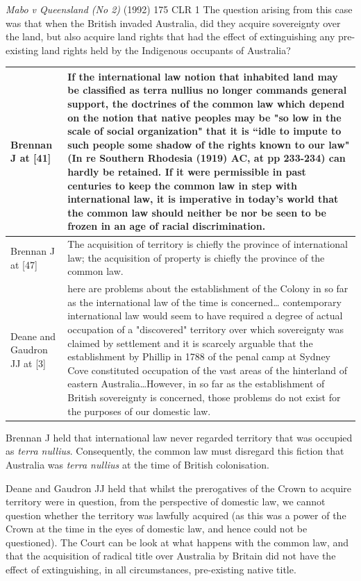 \begin{casedetails}{\textit{Mabo v Queensland (No 2)} (1992) 175 CLR 1}
    \flushleft
    The question arising from this case was that when the British invaded Australia, did they acquire sovereignty over the land, but also acquire land rights that had the effect of extinguishing any pre-existing land rights held by the Indigenous occupants of Australia?

    \begin{longtable}{p{}|>{\raggedright\arraybackslash}p{}}
        Brennan J at [41] & If the international law notion that inhabited land may be classified as terra nullius no longer commands general support, the doctrines of the common law which depend on the notion that native peoples may be "so low in the scale of social organization" that it is ``idle to impute to such people some shadow of the rights known to our law" (In re Southern Rhodesia (1919) AC, at pp 233-234) can hardly be retained. If it were permissible in past centuries to keep the common law in step with international law, it is imperative in today's world that the common law should neither be nor be seen to be frozen in an age of racial discrimination. \\\hline
        Brennan J at [47] & The acquisition of territory is chiefly the province of international law; the acquisition of property is chiefly the province of the common law. \\\hline
        Deane and Gaudron JJ at [3] & [T]here are problems about the establishment of the Colony in so far as the international law of the time is concerned… contemporary international law would seem to have required a degree of actual occupation of a "discovered" territory over which sovereignty was claimed by settlement and it is scarcely arguable that the establishment by Phillip in 1788 of the penal camp at Sydney Cove constituted occupation of the vast areas of the hinterland of eastern Australia…However, in so far as the establishment of British sovereignty is concerned, those problems do not exist for the purposes of our domestic law.
    \end{longtable} 

    Brennan J held that international law never regarded territory that was occupied as \textit{terra nullius}. Consequently, the common law must disregard this fiction that Australia was \textit{terra nullius} at the time of British colonisation.

    \vspace{\baselineskip}

    Deane and Gaudron JJ held that whilst the prerogatives of the Crown to acquire territory were in question, from the perspective of domestic law, we cannot question whether the territory was lawfully acquired (as this was a power of the Crown at the time in the eyes of domestic law, and hence could not be questioned). The Court can be look at what happens with the common law, and that the acquisition of radical title over Australia by Britain did not have the effect of extinguishing, in all circumstances, pre-existing native title.
\end{casedetails}

